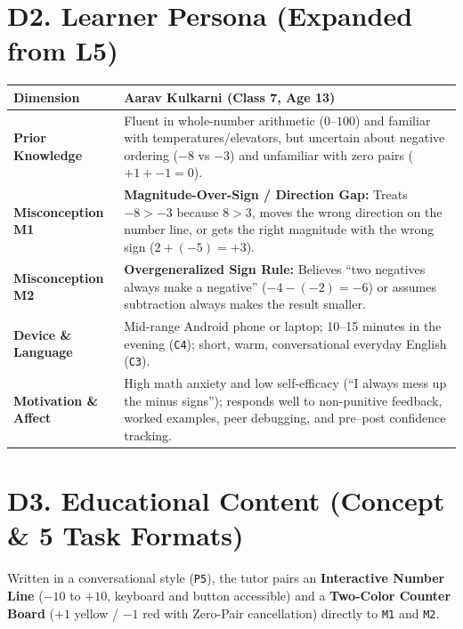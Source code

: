 \documentclass[10pt,a4paper]{article}
\begin{document}
\section*{D2. Learner Persona (Expanded from L5)}
\begin{tabularx}{\linewidth}{@{}l X@{}}
\toprule
\textbf{Dimension} & \textbf{Aarav Kulkarni (Class 7, Age 13)} \\
\midrule
\textbf{Prior Knowledge} & Fluent in whole-number arithmetic ($0$--$100$) and familiar with temperatures/elevators, but uncertain about negative ordering ($-8$ vs $-3$) and unfamiliar with zero pairs ($+1 + -1 = 0$). \\
\textbf{Misconception M1} & \textbf{Magnitude-Over-Sign / Direction Gap:} Treats $-8 > -3$ because $8 > 3$, moves the wrong direction on the number line, or gets the right magnitude with the wrong sign ($2 + (-5) = +3$). \\
\textbf{Misconception M2} & \textbf{Overgeneralized Sign Rule:} Believes ``two negatives always make a negative'' ($-4 - (-2) = -6$) or assumes subtraction always makes the result smaller. \\
\textbf{Device \& Language} & Mid-range Android phone or laptop; 10--15 minutes in the evening (\texttt{C4}); short, warm, conversational everyday English (\texttt{C3}). \\
\textbf{Motivation \& Affect} & High math anxiety and low self-efficacy (``I always mess up the minus signs''); responds well to non-punitive feedback, worked examples, peer debugging, and pre--post confidence tracking. \\
\bottomrule
\end{tabularx}

\section*{D3. Educational Content (Concept \& 5 Task Formats)}
Written in a conversational style (\texttt{P5}), the tutor pairs an \textbf{Interactive Number Line} ($-10$ to $+10$, keyboard and button accessible) and a \textbf{Two-Color Counter Board} ($+1$ yellow / $-1$ red with Zero-Pair cancellation) directly to \texttt{M1} and \texttt{M2}.
\end{document}

